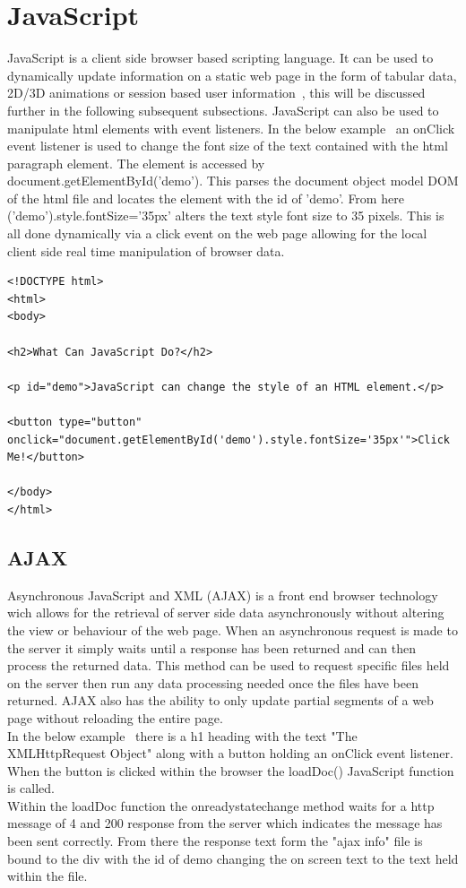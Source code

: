 \section{JavaScript}
JavaScript is a client side browser based scripting language.
It can be used to dynamically update information on a static web page in the form of tabular data, 2D/3D animations or session based user information~\cite{JavaScri52:online}, this will be discussed further in the following subsequent subsections. JavaScript can also be used to manipulate html elements with event listeners. In the below example~\cite{fontSize:online} an onClick event listener is used to change the font size of the text contained with the html paragraph element. The element is accessed by document.getElementById('demo'). This parses the document object model DOM of the html file and locates the element with the id of 'demo'. From here  ('demo').style.fontSize='35px' alters the text style font size to 35 pixels.
This is all done dynamically via a click event on the web page allowing for the local client side real time manipulation of browser data.
\begin{verbatim}
<!DOCTYPE html>
<html>
<body>

<h2>What Can JavaScript Do?</h2>

<p id="demo">JavaScript can change the style of an HTML element.</p>

<button type="button" onclick="document.getElementById('demo').style.fontSize='35px'">Click Me!</button>

</body>
</html> 
\end{verbatim}  
\subsection{AJAX}
Asynchronous JavaScript and XML (AJAX) is a front end browser technology wich allows for the retrieval of server side data asynchronously without altering the view or behaviour of the web page. When an asynchronous request is made to the server it simply waits until a response has been returned and can then process the returned data. This method can be used to request specific files held on the server then run any data processing needed once the files have been returned.  AJAX also has the ability to only update partial segments of a web page without reloading the entire page.~\cite{AJAX:online}\\
In the below example~\cite{AJAXDemo:online} there is a h1 heading with the text "The XMLHttpRequest Object" along with a button holding an onClick event listener. When the button is clicked within the browser the loadDoc() JavaScript function is called.\\
Within the loadDoc function the onreadystatechange method waits for a http message of 4 and 200 response from the server which indicates the message has been sent correctly. From there the response text form the "ajax info" file is bound to the div with the id of demo changing the on screen text to the text held within the file.\\
 
